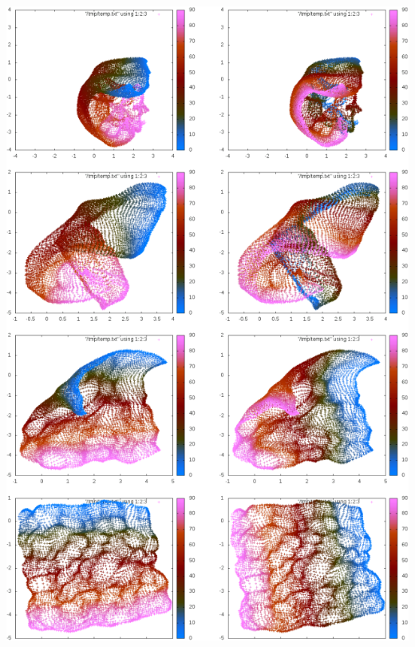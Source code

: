 \documentclass{beamer}
\begin{document}
\begin{frame}
\begin{columns}[T]
\begin{column}{.5\textwidth}
\includegraphics[scale=0.20]{./Figures/drlim.png}
\end{column}
\end{columns}
\end{frame} 
\end{document}
